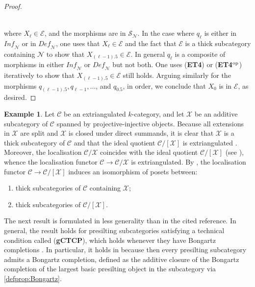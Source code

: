 \documentclass[10pt,twoside, a4paper,reqno]{amsart}
\newcommand{\calN}{\mathcal{N}}
\newcommand{\calC}{\mathcal{C}}
\newcommand{\calE}{\mathcal{E}}
\theoremstyle{definition}
\newtheorem{example}[theorem]{Example}
\begin{document}
\begin{proof}
\begin{equation*}
\begin{tikzcd}[row sep=2em,column sep=1.75em]
\end{tikzcd}
    \end{equation*}
   where $X_{\ell}\in \mathcal{E}$, and the morphisms are in $\mathcal{S}_{\calN}$. In the case where $q_{\ell}$ is either in $\mathit{Inf}_{\calN}$ or in $\mathit{Def}_{\calN}$, one uses that $X_{\ell}\in \mathcal{E}$ and the fact that $\mathcal{E}$ is a thick subcategory containing $\calN$ to show that $X_{(\ell-1).5}\in {\calE}$. In general $q_{\ell}$ is a composite of morphisms in either $\mathit{Inf}_{\calN}$ or $\mathit{Def}_{\calN}$ but not both. One uses (\textbf{ET4}) {or (\textbf{ET4}${}^\textnormal{op}$)} iteratively to show that $X_{(\ell-1).5}\in \mathcal{E}$ still holds. Arguing similarly for the morphisms $q_{(\ell-1).5}, q_{\ell-1},\dots$, and $q_{0.5}$, in order, we conclude that $X_0$ is in $\mathcal{E}$, as desired.
\end{proof}

\begin{example}\label{eg:Ogawa}
    Let $\calC$ be an extriangulated $k$-category, and let $\mathcal{X}$ be an additive subcategory of $\calC$ spanned by projective-injective objects. Because all extensions in $\mathcal{X}$ are {split} and $\mathcal{X}$ is closed under direct summands, it is clear that $\mathcal{X}$ is a thick subcategory of $\calC$ and that the ideal quotient $\calC/[\mathcal{X}]$ is extriangulated \cite[{Prop.} 3.30]{NP19}. Moreover, the localisation $\calC/\mathcal{X}$ coincides with the ideal quotient $\calC/[\mathcal{X}]$ (see {\cite[Example 2.6]{Oga22}}), whence the localisation functor $\calC\to\calC/\mathcal{X}$ is extriangulated.
    By , the localisation functor $\calC\to \calC/[\mathcal{X}]$ induces an isomorphism of posets between:
    \begin{enumerate}
        \item thick subcategories of $\calC$ containing $\mathcal{X}$;
        \item thick subcategories of $\calC/[\mathcal{X}]$.
    \end{enumerate}
\end{example}

The next result is formulated in less generality than in the cited reference. In general, the result holds for presilting subcategories satisfying a technical condition called (\textbf{gCTCP}), which holds whenever they have Bongartz completions \cite[Thm. 5.9(iii)]{Bor24}. In particular, it holds in  because then every presilting subcategory admits a Bongartz completion, defined as the additive closure of the Bongartz completion of the largest basic presilting object in the subcategory via \cref{defprop:Bongartz}.
\end{document}
